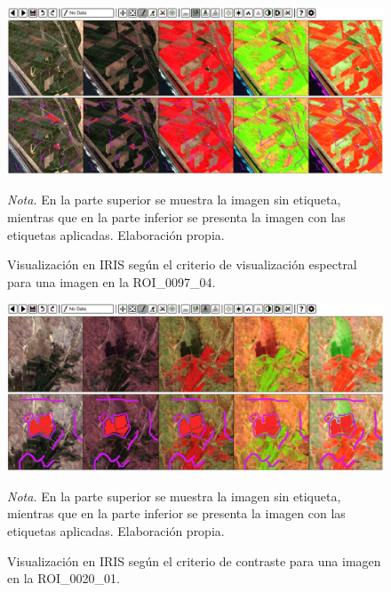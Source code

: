 \begin{figure}[H]
    \centering
    \caption{Visualización en IRIS según el criterio de visualización espectral para una imagen en la ROI\_0097\_04.}
    \includegraphics[width=1\textwidth]{img/6_metodologia/etiquetado_1.png}
    \label{fig:etiquetado1}
    \begin{flushleft}
        \vspace{-\baselineskip}
        \textit{Nota.} En la parte superior se muestra la imagen sin etiqueta, mientras que en la parte inferior se presenta la imagen con las etiquetas aplicadas. Elaboración propia.        
        \vspace{-\baselineskip}
    \end{flushleft}
\end{figure}

\begin{figure}[H]
    \centering
    \caption{Visualización en IRIS según el criterio de contraste para una imagen en la ROI\_0020\_01.}
    \includegraphics[width=1\textwidth]{img/6_metodologia/etiquetado_2.png}
    \label{fig:etiquetado2}
    \begin{flushleft}
        \vspace{-\baselineskip}
        \textit{Nota.} En la parte superior se muestra la imagen sin etiqueta, mientras que en la parte inferior se presenta la imagen con las etiquetas aplicadas. Elaboración propia.        
        \vspace{-\baselineskip}
    \end{flushleft}
\end{figure}


